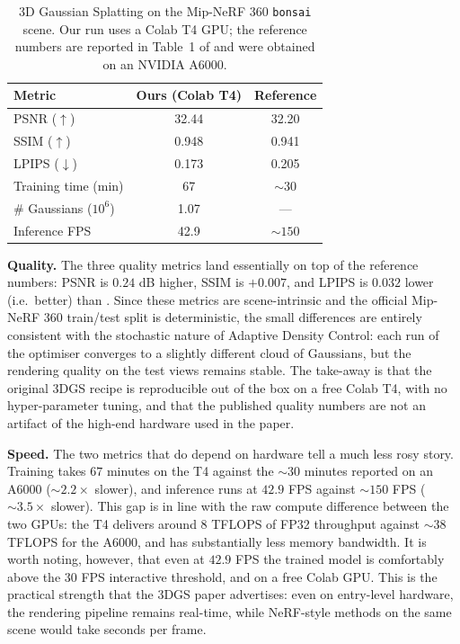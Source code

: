 \documentclass[
	a4paper, %
	10pt, %
	unnumberedsections, %
	twoside, %
]{LTJournalArticle}
\begin{document}
\begin{table}[h]
    \centering
    \small
    \begin{tabular}{lcc}
        \toprule
        Metric                & Ours (Colab T4) & Reference \cite{kerbl20233dgs} \\
        \midrule
        PSNR ($\uparrow$)         & 32.44    & 32.20 \\
        SSIM ($\uparrow$)         & 0.948    & 0.941 \\
        LPIPS ($\downarrow$)      & 0.173    & 0.205 \\
        Training time (min)       & 67       & $\sim 30$ \\
        \# Gaussians ($10^6$)     & 1.07     & --- \\
        Inference FPS             & 42.9     & $\sim 150$ \\
        \bottomrule
    \end{tabular}
    \caption{3D Gaussian Splatting on the Mip-NeRF 360 \texttt{bonsai} scene. Our run uses a Colab T4 GPU; the reference numbers are reported in Table~1 of \cite{kerbl20233dgs} and were obtained on an NVIDIA A6000.}
    \label{tab:exp_bonsai}
\end{table}

\textbf{Quality.} The three quality metrics land essentially on top of the reference numbers: PSNR is $0.24$ dB higher, SSIM is $+0.007$, and LPIPS is $0.032$ lower (i.e.\ better) than \cite{kerbl20233dgs}. Since these metrics are scene-intrinsic and the official Mip-NeRF 360 train/test split is deterministic, the small differences are entirely consistent with the stochastic nature of Adaptive Density Control: each run of the optimiser converges to a slightly different cloud of Gaussians, but the rendering quality on the test views remains stable. The take-away is that the original 3DGS recipe is reproducible out of the box on a free Colab T4, with no hyper-parameter tuning, and that the published quality numbers are not an artifact of the high-end hardware used in the paper.

\textbf{Speed.} The two metrics that do depend on hardware tell a much less rosy story. Training takes $67$ minutes on the T4 against the $\sim 30$ minutes reported on an A6000 ($\sim 2.2\times$ slower), and inference runs at $42.9$ FPS against $\sim 150$ FPS ($\sim 3.5\times$ slower). This gap is in line with the raw compute difference between the two GPUs: the T4 delivers around $8$ TFLOPS of FP32 throughput against $\sim 38$ TFLOPS for the A6000, and has substantially less memory bandwidth. It is worth noting, however, that even at $42.9$ FPS the trained model is comfortably above the $30$ FPS interactive threshold, and on a free Colab GPU. This is the practical strength that the 3DGS paper advertises: even on entry-level hardware, the rendering pipeline remains real-time, while NeRF-style methods on the same scene would take seconds per frame.
\end{document}
